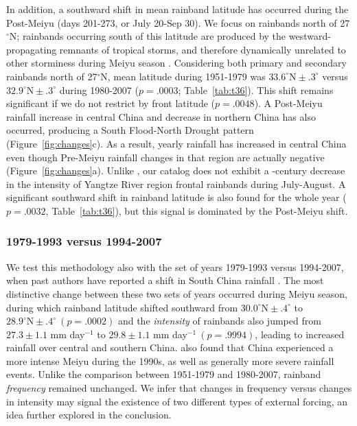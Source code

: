 \documentclass{ametsoc}
\begin{document}
	In addition, a southward shift in mean rainband latitude has occurred during the Post-Meiyu (days 201-273, or July 20-Sep 30). We focus on rainbands north of 27$^{\circ}$N; rainbands occurring south of this latitude are produced by the westward-propagating remnants of tropical storms, and therefore dynamically unrelated to other storminess during Meiyu season \citep{Day2015}. Considering both primary and secondary rainbands north of 27$^{\circ}$N, mean latitude during 1951-1979 was $33.6^\circ \textrm{N} \pm .3^\circ$ versus $32.9^\circ \textrm{N} \pm .3^\circ$ during 1980-2007 ($p=.0003$; Table~\ref{tab:t36}). This shift remains significant if we do not restrict by front latitude ($p=.0048$). A Post-Meiyu rainfall increase in central China and decrease in northern China has also occurred, producing a South Flood-North Drought pattern (Figure~\ref{fig:changes}c). As a result, yearly rainfall has increased in central China even though Pre-Meiyu rainfall changes in that region are actually negative (Figure~\ref{fig:changes}a). Unlike \citet{Yu2010}, our catalog does not exhibit a -century decrease in the intensity of Yangtze River region frontal rainbands during July-August. A significant southward shift in rainband latitude is also found for the whole year ($p=.0032$, Table~\ref{tab:t36}), but this signal is dominated by the Post-Meiyu shift.
	
\subsubsection{1979-1993 versus 1994-2007}
	
	We test this methodology also with the set of years 1979-1993 versus 1994-2007, when past authors have reported a shift in South China rainfall \citep{Kwon2007,Wu2010,Yim2013}. The most distinctive change between these two sets of years occurred during Meiyu season, during which rainband latitude shifted southward from $30.0^\circ \textrm{N} \pm .4^\circ$ to $28.9^\circ \textrm{N} \pm .4^\circ\ (p=.0002)$ and the \textit{intensity} of rainbands also jumped from $27.3 \pm 1.1$ mm day$^{-1}$ to $29.8 \pm 1.1$ mm day$^{-1}\ (p=.9994)$, leading to increased rainfall over central and southern China. \citet{Zou2015} also found that China experienced a more intense Meiyu during the 1990s, as well as generally more severe rainfall events. Unlike the comparison between 1951-1979 and 1980-2007, rainband \textit{frequency} remained unchanged. We infer that changes in frequency versus changes in intensity may signal the existence of two different types of external forcing, an idea further explored in the conclusion.
	
\end{document}
